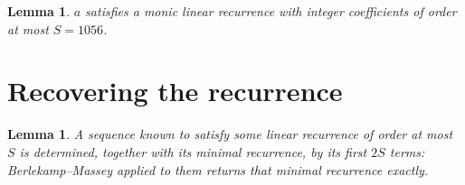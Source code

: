 \documentclass[11pt,a4paper]{article}
\theoremstyle{plain}
\newtheorem{lemma}[theorem]{Lemma}
\theoremstyle{definition}
\begin{document}
\begin{lemma}\label{lem:cf}
$a$ satisfies a monic linear recurrence with integer coefficients of order at most $S=1056$.
\end{lemma}

\section{Recovering the recurrence}

\begin{lemma}\label{lem:bm}
A sequence known to satisfy some linear recurrence of order at most $S$ is determined, together
with its minimal recurrence, by its first $2S$ terms: Berlekamp--Massey applied to them returns
that minimal recurrence exactly.
\end{lemma}
\end{document}
